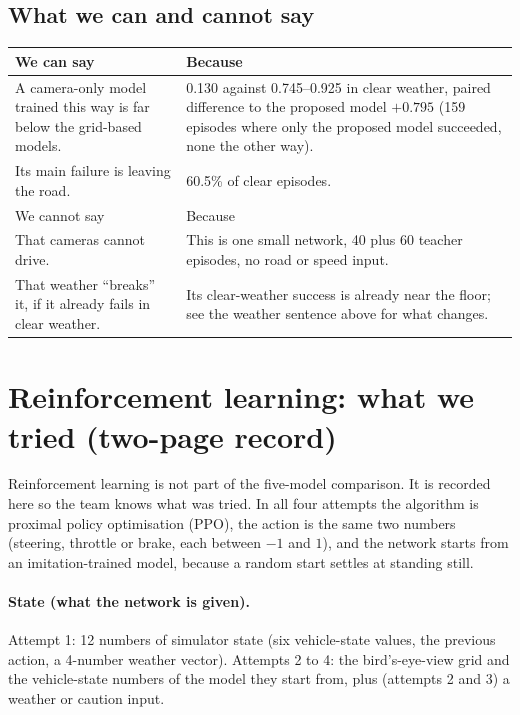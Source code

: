 \documentclass[11pt,a4paper]{article}
\begin{document}
\subsection{What we can and cannot say}
\begin{tabularx}{\textwidth}{@{}>{\raggedright\arraybackslash}p{5.2cm}X@{}}\toprule
We can say & Because\\\midrule
A camera-only model trained this way is far below the grid-based models. & 0.130 against 0.745--0.925 in clear weather, paired difference to the proposed model $+0.795$ (159 episodes where only the proposed model succeeded, none the other way).\\
Its main failure is leaving the road. & 60.5\% of clear episodes.\\\midrule
We cannot say & Because\\\midrule
That cameras cannot drive. & This is one small network, 40 plus 60 teacher episodes, no road or speed input.\\
That weather ``breaks'' it, if it already fails in clear weather. & Its clear-weather success is already near the floor; see the weather sentence above for what changes.\\\bottomrule
\end{tabularx}

\section{Reinforcement learning: what we tried (two-page record)}\label{sec:rlrecord}
Reinforcement learning is not part of the five-model comparison. It is recorded here so the team knows what was tried. In all four attempts the algorithm is proximal policy optimisation (PPO), the action is the same two numbers (steering, throttle or brake, each between $-1$ and $1$), and the network starts from an imitation-trained model, because a random start settles at standing still.

\paragraph{State (what the network is given).} Attempt 1: 12 numbers of simulator state (six vehicle-state values, the previous action, a 4-number weather vector). Attempts 2 to 4: the bird's-eye-view grid and the vehicle-state numbers of the model they start from, plus (attempts 2 and 3) a weather or caution input.
\end{document}
